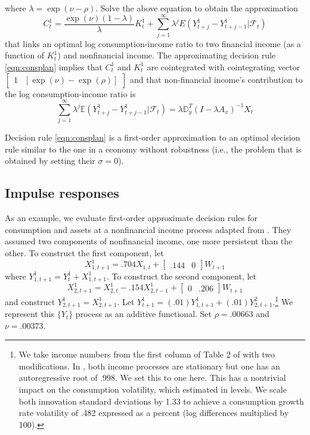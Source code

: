 \documentclass[12pt]{article}
\begin{document}
where $\lambda = \exp(\nu - \rho)$.  Solve the above equation to obtain the approximation
\begin{equation}\label{eqn:consplan}
C^{1}_{t} = \frac{\exp(\nu)(1-\lambda)}{\lambda} K^{1}_{t} + \sum^{\infty}_{j=1} \lambda^{j} E(Y^{1}_{t+j} - Y^{1}_{t+j-1} \vert \mathcal{F}_t)
\end{equation}
that links an optimal log consumption-income ratio to  two  financial income (as a function of $K_t^1$) and nonfinancial income.
 The approximating decision rule \eqref{eqn:consplan} implies that $C_t^1$ and $K_t^1$ are cointegrated with  cointegrating vector
$\begin{bmatrix} 1& [\exp(\nu) -  \exp(\rho) ] \end{bmatrix}$ and that  non-financial income's contribution to the log consumption-income ratio is
\begin{equation*}
\sum^{\infty}_{j=1} \lambda^{j} \mathbb{E}(Y^{1}_{t+j} - Y^{1}_{t+j-1} \vert \mathcal{F}_t) = \lambda \mathbb{D}_{y}^{T} (I - \lambda A_{x})^{-1} X_{t}
\end{equation*}



Decision rule  \eqref{eqn:consplan}  is a first-order approximation to an optimal decision rule similar to the one in a  \cite{hst:1999} economy without robustness (i.e., the problem that is obtained by setting  their
$\sigma =0$).

\subsection{Impulse responses}

As an example, we evaluate  first-order approximate  decision rules  for consumption and assets at a nonfinancial income process adapted from  \cite{hst:1999}.
They assumed two components of nonfinancial income, one more persistent than the other. To construct the first component, let
\[
X_{1,t+1}^1 = .704 X_{1,t} + \begin{bmatrix} .144 & 0 \end{bmatrix} W_{t+1}
\]
where $Y_{1,t+1}^1 = Y_t^1 + X_{1, t+1}^1$.  To construct the second component, let
\[
X_{2,t+1}^1 = X_{2,t}^1 - .154 X_{2,t-1}^1 + \begin{bmatrix} 0 & .206 \end{bmatrix} W_{t+1}
\]
and construct $Y_{2,t+1}^1 = X_{2,t+1}^1$.
Let $Y_{t+1}^1 = (.01)Y_{1,t+1}^1 + (.01)Y_{2,t+1}^2$.\footnote{We take income numbers from the first column of Table 2 of \cite{hst:1999} with two modifications.  In \cite{hst:1999}, both income processes are stationary but one has an autoregressive root of .998.  We set this to one here.  This has a nontrivial impact on the consumption volatility, which \citeauthor{hst:1999} estimated in levels.  We scale both innovation standard deviations by  1.33 to achieve a consumption growth rate volatility of .482 expressed as a percent (log differences multiplied by 100).}    We represent this $\{Y_t\}$ process as an additive functional.  Set $\rho = .00663$ and $\nu = .00373$.
\end{document}
